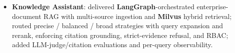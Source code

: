 \documentclass{resume-v2}
\begin{document}
\begin{itemize}
  \item \textbf{Knowledge Assistant}: delivered \textbf{LangGraph}-orchestrated enterprise-document RAG with multi-source ingestion and \textbf{Milvus} hybrid retrieval; routed precise / balanced / broad strategies with query expansion and rerank, enforcing citation grounding, strict-evidence refusal, and RBAC; added LLM-judge/citation evaluations and per-query observability.
\end{itemize}
\end{document}

